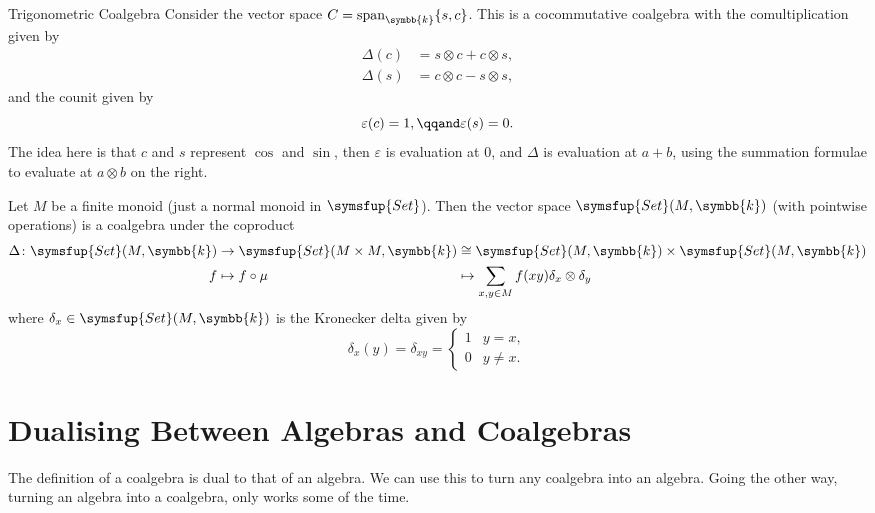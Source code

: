 \documentclass[fleqn]{NotesClass}
\makeatletter
\newcommand{\c@egory}[1]{\symsfup{#1}}
\newcommand{\Set}{\c@egory{Set}}
\newcommand{\isomorphic}{\cong}
\renewcommand{\field}{\symbb{k}}
\DeclareMathOperator{\Span}{span}
\makeatother
\begin{document}
    \begin{exm}{Trigonometric Coalgebra}{}
        Consider the vector space \(C = \Span_{\field}\{s, c\}\).
        This is a cocommutative coalgebra with the comultiplication given by
        \begin{align}
            \Delta(c) &= s \otimes c + c \otimes s,\\
            \Delta(s) &= c \otimes c - s \otimes s,
        \end{align}
        and the counit given by
        \begin{equation}
            \varepsilon(c) = 1, \qqand \varepsilon(s) = 0.
        \end{equation}
        The idea here is that \(c\) and \(s\) represent \(\cos\) and \(\sin\), then \(\varepsilon\) is evaluation at 0, and \(\Delta\) is evaluation at \(a + b\), using the summation formulae to evaluate at \(a \otimes b\) on the right.
    \end{exm}
    
    \begin{exm}{}{}
        Let \(M\) be a finite monoid (just a normal monoid in \(\Set\)).
        Then the vector space \(\Set(M, \field)\) (with pointwise operations) is a coalgebra under the coproduct
        \begin{equation}
            \begin{alignedat}{3}
                \Delta \colon \Set(M, \field) &\to \Set(M \times M, \field) &&\isomorphic \Set(M, \field) \times \Set(M, \field)\\
                f &\mapsto f \circ \mu &&\mapsto \sum_{x, y \in M} f(xy) \delta_x \otimes \delta_y
            \end{alignedat}
        \end{equation}
        where \(\delta_x \in \Set(M, \field)\) is the Kronecker delta given by
        \begin{equation}
            \delta_x(y) = \delta_{xy} = 
            \begin{cases}
                1 & y = x,\\
                0 & y \ne x.
            \end{cases}
        \end{equation}
    \end{exm}
    
    \section{Dualising Between Algebras and Coalgebras}
    The definition of a coalgebra is dual to that of an algebra.
    We can use this to turn any coalgebra into an algebra.
    Going the other way, turning an algebra into a coalgebra, only works some of the time.
    
\end{document}
